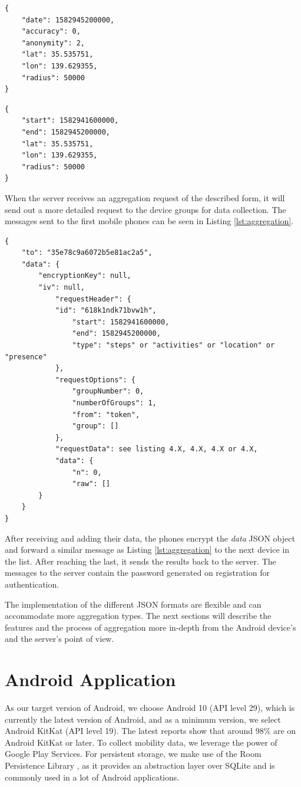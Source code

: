 \begin{lstlisting}[caption=Search options for locations, label={lst:locations}]
{
    "date": 1582945200000,
    "accuracy": 0,
    "anonymity": 2,
    "lat": 35.535751,
    "lon": 139.629355,
    "radius": 50000
}
\end{lstlisting}

\begin{lstlisting}[caption=Search options for presence, label={lst:presence}]
{
    "start": 1582941600000,
    "end": 1582945200000,
    "lat": 35.535751,
    "lon": 139.629355,
    "radius": 50000
}
\end{lstlisting}


When the server receives an aggregation request of the described form, it will send out a more detailed request to the device groups for data collection. The messages sent to the first mobile phones can be seen in Listing \ref{lst:aggregation}.

\begin{lstlisting}[caption=First aggregation request sent to the groups, label={lst:aggregation}]
{
	"to": "35e78c9a6072b5e81ac2a5",
	"data": {
		"encryptionKey": null,
		"iv": null,
            "requestHeader": {
			"id": "618k1ndk71bvw1h",
                "start": 1582941600000,
                "end": 1582945200000,
                "type": "steps" or "activities" or "location" or "presence"
            },
            "requestOptions": {
                "groupNumber": 0,
                "numberOfGroups": 1,
                "from": "token",
                "group": []
            },
            "requestData": see listing 4.X, 4.X, 4.X or 4.X,
            "data": {
                "n": 0,
                "raw": []
		}
	}
}
\end{lstlisting}

After receiving and adding their data, the phones encrypt the \textit{data} JSON object and forward a similar message as Listing \ref{lst:aggregation} to the next device in the list. After reaching the last, it sends the results back to the server. The messages to the server contain the password generated on registration for authentication.

The implementation of the different JSON formats are flexible and can accommodate more aggregation types. The next sections will describe the features and the process of aggregation more in-depth from the Android device's and the server's point of view.

\section{Android Application}
As our target version of Android, we choose Android 10 (API level 29), which is currently the latest version of Android, and as a minimum version, we select Android KitKat (API level 19). The latest reports \cite{android3}\cite{android4} show that around 98\% are on Android KitKat or later. To collect mobility data, we leverage the power of Google Play Services. For persistent storage, we make use of the Room Persistence Library \cite{room}, as it provides an abstraction layer over SQLite and is commonly used in a lot of Android applications.

